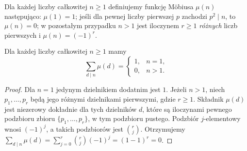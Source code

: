\begin{definicja}\label{aa:def:mobius}
Dla każdej liczby całkowitej $n\ge1$ definiujemy
funkcję Möbiusa $\mu(n)$ następująco:
$\mu(1)=1$; jeśli dla pewnej liczby pierwszej $p$
zachodzi $p^2\mid n$, to $\mu(n)=0$;
w pozostałym przypadku $n>1$ jest iloczynem $r\ge1$
\emph{różnych} liczb pierwszych i $\mu(n)=(-1)^r$.
\end{definicja}
\begin{lemat}\label{aa:lem:mobius-sum}
Dla każdej liczby całkowitej $n\ge1$ mamy
\[
\sum_{d\mid n}\mu(d)=
\begin{cases}1,&n=1,\\0,&n>1.\end{cases}
\]
\end{lemat}
\begin{proof}
Dla $n=1$ jedynym dzielnikiem dodatnim jest $1$.
Jeżeli $n>1$, niech $p_1,\ldots,p_r$ będą jego
różnymi dzielnikami pierwszymi, gdzie $r\ge1$.
Składnik $\mu(d)$ jest niezerowy dokładnie dla tych
dzielników $d$, które są iloczynami pewnego podzbioru
zbioru $\{p_1,\ldots,p_r\}$, w tym podzbioru pustego.
Podzbiór $j$-elementowy wnosi $(-1)^j$, a takich
podzbiorów jest $\binom rj$. Otrzymujemy
$\sum_{d\mid n}\mu(d)
=\sum_{j=0}^r\binom rj(-1)^j=(1-1)^r=0$.
\end{proof}

